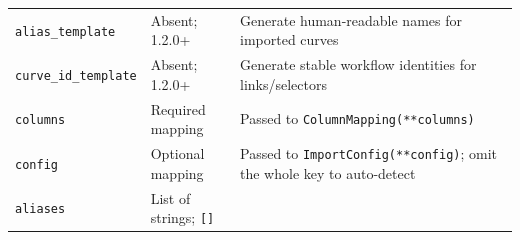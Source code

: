 \documentclass[
  10pt,
  a4paper,
  oneside]{scrreprt}
\begin{document}
\begin{longtable}[]{@{}lll@{}}
\begin{minipage}[t]{0.30\columnwidth}\raggedright
\texttt{alias\_template}\strut
\end{minipage} & \begin{minipage}[t]{0.30\columnwidth}\raggedright
Absent; 1.2.0+\strut
\end{minipage} & \begin{minipage}[t]{0.30\columnwidth}\raggedright
Generate human-readable names for imported curves\strut
\end{minipage}\tabularnewline
\begin{minipage}[t]{0.30\columnwidth}\raggedright
\texttt{curve\_id\_template}\strut
\end{minipage} & \begin{minipage}[t]{0.30\columnwidth}\raggedright
Absent; 1.2.0+\strut
\end{minipage} & \begin{minipage}[t]{0.30\columnwidth}\raggedright
Generate stable workflow identities for links/selectors\strut
\end{minipage}\tabularnewline
\begin{minipage}[t]{0.30\columnwidth}\raggedright
\texttt{columns}\strut
\end{minipage} & \begin{minipage}[t]{0.30\columnwidth}\raggedright
Required mapping\strut
\end{minipage} & \begin{minipage}[t]{0.30\columnwidth}\raggedright
Passed to \texttt{ColumnMapping(**columns)}\strut
\end{minipage}\tabularnewline
\begin{minipage}[t]{0.30\columnwidth}\raggedright
\texttt{config}\strut
\end{minipage} & \begin{minipage}[t]{0.30\columnwidth}\raggedright
Optional mapping\strut
\end{minipage} & \begin{minipage}[t]{0.30\columnwidth}\raggedright
Passed to \texttt{ImportConfig(**config)}; omit the whole key to
auto-detect\strut
\end{minipage}\tabularnewline
\begin{minipage}[t]{0.30\columnwidth}\raggedright
\texttt{aliases}\strut
\end{minipage} & \begin{minipage}[t]{0.30\columnwidth}\raggedright
List of strings; \texttt{{[}{]}}\strut
\end{minipage} & \begin{minipage}[t]{0.30\columnwidth}\raggedright

\end{minipage}
\end{longtable}
\end{document}
